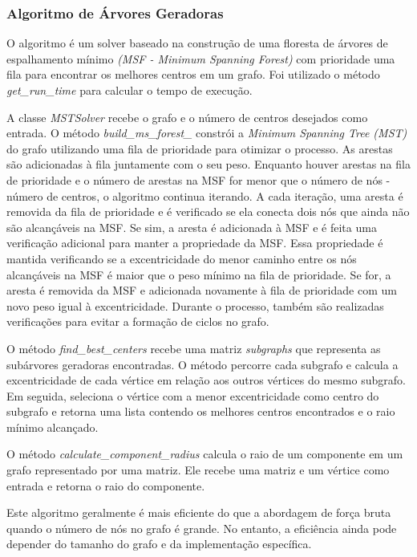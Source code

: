 \subsubsection{\esp Algoritmo de Árvores Geradoras}
O algoritmo é um solver baseado na construção de uma floresta de árvores de espalhamento mínimo \textit{(MSF - Minimum Spanning Forest)} com prioridade uma fila para encontrar os melhores centros em um grafo.  Foi utilizado o método \textit{get\_run\_time} para calcular o tempo de execução.

A classe \textit{MSTSolver} recebe o grafo e o número de centros desejados como entrada. O método \textit{build\_ms\_forest\_} constrói a \textit{Minimum Spanning Tree (MST)} do grafo utilizando uma fila de prioridade para otimizar o processo. As arestas são adicionadas à fila juntamente com o seu peso. Enquanto houver arestas na fila de prioridade e o número de arestas na MSF for menor que o número de nós - número de centros, o algoritmo continua iterando. A cada iteração, uma aresta é removida da fila de prioridade e é verificado se ela conecta dois nós que ainda não são alcançáveis na MSF. Se sim, a aresta é adicionada à MSF e é feita uma verificação adicional para manter a propriedade da MSF. Essa propriedade é mantida verificando se a excentricidade do menor caminho entre os nós alcançáveis na MSF é maior que o peso mínimo na fila de prioridade. Se for, a aresta é removida da MSF e adicionada novamente à fila de prioridade com um novo peso igual à excentricidade. Durante o processo, também são realizadas verificações para evitar a formação de ciclos no grafo.

O método \textit{find\_best\_centers} recebe uma matriz \textit{subgraphs} que representa as subárvores geradoras encontradas. O método percorre cada subgrafo e calcula a excentricidade de cada vértice em relação aos outros vértices do mesmo subgrafo. Em seguida, seleciona o vértice com a menor excentricidade como centro do subgrafo e retorna uma lista contendo os melhores centros encontrados e o raio mínimo alcançado.

O método \textit{calculate\_component\_radius} calcula o raio de um componente em um grafo representado por uma matriz. Ele recebe uma matriz e um vértice como entrada e retorna o raio do componente.

Este algoritmo geralmente é mais eficiente do que a abordagem de força bruta quando o número de nós no grafo é grande. No entanto, a eficiência ainda pode depender do tamanho do grafo e da implementação específica.

